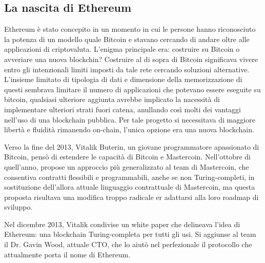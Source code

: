 \subsection*{La nascita di Ethereum}
Ethereum è stato concepito in un momento in cui le persone hanno riconosciuto la potenza di un modello quale Bitcoin e stavano cercando di andare oltre alle applicazioni di criptovaluta. L'enigma principale era: costruire su Bitcoin o avveriare una nuova blockchin? Costruire al di sopra di Bitcoin significava vivere entro gli intenzionali limiti imposti da tale rete cercando soluzioni alternative. L'insieme limitato di tipologia di dati e dimensione della memorizzazione di questi sembrava limitare il numero di applicazioni che potevano essere eseguite su bitcoin, qualsiasi ulteriore aggiunta avrebbe implicato la nacessità di implementare ulteriori strati fuori catena, anullando così molti dei vantaggi nell'uso di una blockchain pubblica. Per tale progetto si necessitava di maggiore libertà e fluidità rimanendo on-chain, l'unica opzione era una nuova blockchain.

Verso la fine del 2013, Vitalik Buterin, un giovane programmatore apassionato di Bitcoin, pensò di estendere le capacità di Bitcoin e Mastercoin. Nell'ottobre di quell'anno, propose un approccio più generalizzato al team di Mastercoin, che consentiva contratti flessibili e programmabili, anche se non Turing-completi, in sostituzione dell'allora attuale linguaggio contrattuale di Mastercoin, ma questa proposta risultava una modifica troppo radicale er adattarsi alla loro roadmap di sviluppo. 

Nel dicembre 2013, Vitalik condivise un white paper che delineava l'idea di Ethereum: una blockchain Turing-completa per tutti gli usi. Si aggiunse al team  il Dr. Gavin Wood, attuale CTO, che lo aiutò nel perfezionale il protocollo che attualmente porta il nome di Ethereum. 

